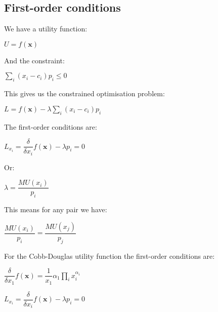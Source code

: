 
\subsection{First-order conditions}

We have a utility function:

\(U=f(\mathbf x)\)

And the constraint:

\(\sum_i (x_i-c_i)p_i\le 0\)

This gives us the constrained optimisation problem:

\(L=f(\mathbf x)-\lambda \sum_i (x_i-c_i)p_i\)

The first-order conditions are:

\(L_{x_i}=\dfrac{\delta }{\delta x_i}f(\mathbf x)-\lambda p_i=0\)

Or:

\(\lambda = \dfrac{MU(x_i)}{p_i}\)

This means for any pair we have:

\(\dfrac{MU(x_i)}{p_i}=\dfrac{MU(x_j)}{p_j}\)

For the Cobb-Douglas utility function the first-order conditions are:

\(\dfrac{\delta }{\delta x_1}f(\mathbf x) = \dfrac{1}{x_1}\alpha_1\prod_i x_i^{\alpha_i}\)

\(L_{x_i}=\dfrac{\delta }{\delta x_i}f(\mathbf x)-\lambda p_i=0\)
